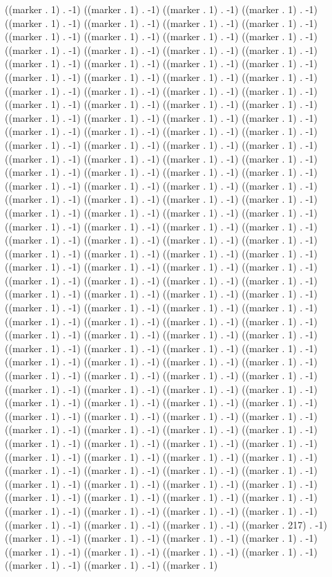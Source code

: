 ((marker . 1) . -1) ((marker . 1) . -1) ((marker . 1) . -1) ((marker . 1) . -1) ((marker . 1) . -1) ((marker . 1) . -1) ((marker . 1) . -1) ((marker . 1) . -1) ((marker . 1) . -1) ((marker . 1) . -1) ((marker . 1) . -1) ((marker . 1) . -1) ((marker . 1) . -1) ((marker . 1) . -1) ((marker . 1) . -1) ((marker . 1) . -1) ((marker . 1) . -1) ((marker . 1) . -1) ((marker . 1) . -1) ((marker . 1) . -1) ((marker . 1) . -1) ((marker . 1) . -1) ((marker . 1) . -1) ((marker . 1) . -1) ((marker . 1) . -1) ((marker . 1) . -1) ((marker . 1) . -1) ((marker . 1) . -1) ((marker . 1) . -1) ((marker . 1) . -1) ((marker . 1) . -1) ((marker . 1) . -1) ((marker . 1) . -1) ((marker . 1) . -1) ((marker . 1) . -1) ((marker . 1) . -1) ((marker . 1) . -1) ((marker . 1) . -1) ((marker . 1) . -1) ((marker . 1) . -1) ((marker . 1) . -1) ((marker . 1) . -1) ((marker . 1) . -1) ((marker . 1) . -1) ((marker . 1) . -1) ((marker . 1) . -1) ((marker . 1) . -1) ((marker . 1) . -1) ((marker . 1) . -1) ((marker . 1) . -1) ((marker . 1) . -1) ((marker . 1) . -1) ((marker . 1) . -1) ((marker . 1) . -1) ((marker . 1) . -1) ((marker . 1) . -1) ((marker . 1) . -1) ((marker . 1) . -1) ((marker . 1) . -1) ((marker . 1) . -1) ((marker . 1) . -1) ((marker . 1) . -1) ((marker . 1) . -1) ((marker . 1) . -1) ((marker . 1) . -1) ((marker . 1) . -1) ((marker . 1) . -1) ((marker . 1) . -1) ((marker . 1) . -1) ((marker . 1) . -1) ((marker . 1) . -1) ((marker . 1) . -1) ((marker . 1) . -1) ((marker . 1) . -1) ((marker . 1) . -1) ((marker . 1) . -1) ((marker . 1) . -1) ((marker . 1) . -1) ((marker . 1) . -1) ((marker . 1) . -1) ((marker . 1) . -1) ((marker . 1) . -1) ((marker . 1) . -1) ((marker . 1) . -1) ((marker . 1) . -1) ((marker . 1) . -1) ((marker . 1) . -1) ((marker . 1) . -1) ((marker . 1) . -1) ((marker . 1) . -1) ((marker . 1) . -1) ((marker . 1) . -1) ((marker . 1) . -1) ((marker . 1) . -1) ((marker . 1) . -1) ((marker . 1) . -1) ((marker . 1) . -1) ((marker . 1) . -1) ((marker . 1) . -1) ((marker . 1) . -1) ((marker . 1) . -1) ((marker . 1) . -1) ((marker . 1) . -1) ((marker . 1) . -1) ((marker . 1) . -1) ((marker . 1) . -1) ((marker . 1) . -1) ((marker . 1) . -1) ((marker . 1) . -1) ((marker . 1) . -1) ((marker . 1) . -1) ((marker . 1) . -1) ((marker . 1) . -1) ((marker . 1) . -1) ((marker . 1) . -1) ((marker . 1) . -1) ((marker . 1) . -1) ((marker . 1) . -1) ((marker . 1) . -1) ((marker . 1) . -1) ((marker . 1) . -1) ((marker . 1) . -1) ((marker . 1) . -1) ((marker . 1) . -1) ((marker . 1) . -1) ((marker . 1) . -1) ((marker . 1) . -1) ((marker . 1) . -1) ((marker . 1) . -1) ((marker . 1) . -1) ((marker . 1) . -1) ((marker . 1) . -1) ((marker . 1) . -1) ((marker . 1) . -1) ((marker . 1) . -1) ((marker . 1) . -1) ((marker . 1) . -1) ((marker . 1) . -1) ((marker . 1) . -1) ((marker . 1) . -1) ((marker . 1) . -1) ((marker . 1) . -1) ((marker . 1) . -1) ((marker . 1) . -1) ((marker . 1) . -1) ((marker . 1) . -1) ((marker . 1) . -1) ((marker . 1) . -1) ((marker . 1) . -1) ((marker . 1) . -1) ((marker . 1) . -1) ((marker . 1) . -1) ((marker . 1) . -1) ((marker . 1) . -1) ((marker . 1) . -1) ((marker . 217) . -1) ((marker . 1) . -1) ((marker . 1) . -1) ((marker . 1) . -1) ((marker . 1) . -1) ((marker . 1) . -1) ((marker . 1) . -1) ((marker . 1) . -1) ((marker . 1) . -1) ((marker . 1) . -1) ((marker . 1) . -1) ((marker . 1) 